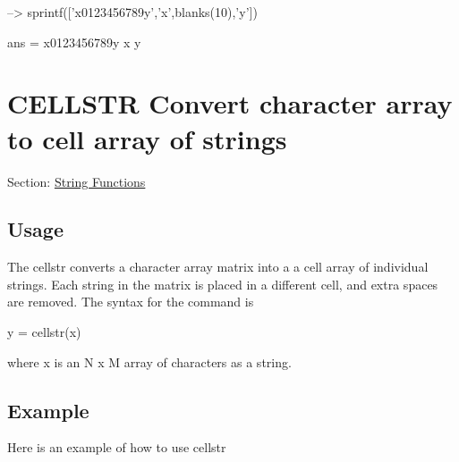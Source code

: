 \begin{DoxyVerbInclude}
--> sprintf(['x0123456789y\n','x',blanks(10),'y\n'])

ans = 
x0123456789y
x          y
\end{DoxyVerbInclude}
 \hypertarget{string_cellstr}{}\section{C\-E\-L\-L\-S\-T\-R Convert character array to cell array of strings}\label{string_cellstr}
Section\-: \hyperlink{sec_string}{String Functions} \hypertarget{vtkwidgets_vtkxyplotwidget_Usage}{}\subsection{Usage}\label{vtkwidgets_vtkxyplotwidget_Usage}
The {\ttfamily cellstr} converts a character array matrix into a a cell array of individual strings. Each string in the matrix is placed in a different cell, and extra spaces are removed. The syntax for the command is \begin{DoxyVerb}   y = cellstr(x)
\end{DoxyVerb}
 where {\ttfamily x} is an {\ttfamily N x M} array of characters as a string. \hypertarget{variables_struct_Example}{}\subsection{Example}\label{variables_struct_Example}
Here is an example of how to use {\ttfamily cellstr}


